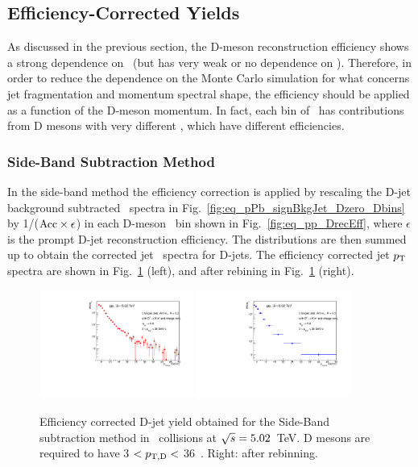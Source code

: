 \subsection{Efficiency-Corrected Yields}

As discussed in the previous section, the D-meson reconstruction efficiency shows a strong dependence on \ptd\ (but has very weak or no dependence on \ptjet).
Therefore, in order to reduce the dependence on the Monte Carlo simulation for what concerns jet fragmentation and momentum spectral shape,
the efficiency should be applied as a function of the D-meson momentum. In fact, each bin of \ptjet\ has contributions from D mesons with very different \ptd, which have different efficiencies.

\subsubsection{Side-Band Subtraction Method}
In the side-band method the efficiency correction is applied by rescaling the D-jet background subtracted \pt\ spectra in Fig.~\ref{fig:eq_pPb_signBkgJet_Dzero_Dbins}
by 1/(${\rm Acc} \times \epsilon$) in each D-meson \pt\ bin shown in Fig.~\ref{fig:eq_pp_DrecEff}, where $\epsilon$ is the prompt D-jet reconstruction efficiency.
The distributions are then summed up to obtain the corrected jet \pt\ spectra for D-jets. 
The efficiency corrected jet $p_{\text T}$ spectra are shown in Fig.~\ref{fig:eq_pPb_Directjet_corrSum} (left), and after rebining in Fig.~\ref{fig:eq_pPb_Directjet_corrSum} (right).

\begin{figure}[bth]
\centering
\includegraphics[width=0.45\textwidth]{pPbcuts_2sig/jetPtSpectrum_SB_pTD3}
\includegraphics[width=0.45\textwidth]{pPbcuts_2sig/jetPtSpectrum_SB_Rebin_pTD3}
\caption{Efficiency corrected D-jet yield obtained for the Side-Band subtraction method in \pp\ collisions at $\sqrt{s}=5.02$~TeV. D mesons are required to have 3 $< p_{\mathrm{T,D}}<$ 36~\GeVc. Right: after rebinning.}
\label{fig:eq_pPb_Directjet_corrSum}
\end{figure}


